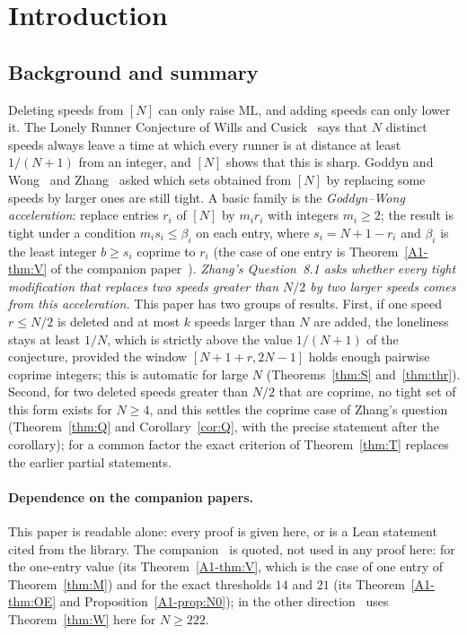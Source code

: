 \documentclass[11pt]{article}
\theoremstyle{definition}
\theoremstyle{remark}
\newcommand{\ML}{\mathrm{ML}}
\newcommand{\xA}[1]{\ref{A1-#1}}
\begin{document}
\section{Introduction}\label{sec:intro}

\subsection{Background and summary}
Deleting speeds from $[N]$ can only raise $\ML$, and adding speeds can only lower it. The Lonely Runner Conjecture of Wills and Cusick~\cite{W} says that $N$ distinct speeds always leave a time at which every runner is at distance at least $1/(N+1)$ from an integer, and $[N]$ shows that this is sharp. Goddyn and Wong~\cite{GW} and Zhang~\cite{Z} asked which sets obtained from $[N]$ by replacing some speeds by larger ones are still tight. A basic family is the \emph{Goddyn--Wong acceleration}: replace entries $r_i$ of $[N]$ by $m_ir_i$ with integers $m_i\ge2$; the result is tight under a condition $m_is_i\le\beta_i$ on each entry, where $s_i=N+1-r_i$ and $\beta_i$ is the least integer $b\ge s_i$ coprime to $r_i$ (the case of one entry is Theorem~\xA{thm:V} of the companion paper~\cite{A1}). \emph{Zhang's Question~8.1 asks whether every tight modification that replaces two speeds greater than $N/2$ by two larger speeds comes from this acceleration.} This paper has two groups of results. First, if one speed $r\le N/2$ is deleted and at most $k$ speeds larger than $N$ are added, the loneliness stays at least $1/N$, which is strictly above the value $1/(N+1)$ of the conjecture, provided the window $[N+1+r,2N-1]$ holds enough pairwise coprime integers; this is automatic for large $N$ (Theorems~\ref{thm:S} and~\ref{thm:thr}). Second, for two deleted speeds greater than $N/2$ that are coprime, no tight set of this form exists for $N\ge4$, and this settles the coprime case of Zhang's question (Theorem~\ref{thm:Q} and Corollary~\ref{cor:Q}, with the precise statement after the corollary); for a common factor the exact criterion of Theorem~\ref{thm:T} replaces the earlier partial statements.

\paragraph{Dependence on the companion papers.}
This paper is readable alone: every proof is given here, or is a Lean statement cited from the library. The companion~\cite{A1} is quoted, not used in any proof here: for the one-entry value (its Theorem~\xA{thm:V}, which is the case of one entry of Theorem~\ref{thm:M}) and for the exact thresholds $14$ and $21$ (its Theorem~\xA{thm:OE} and Proposition~\xA{prop:N0}); in the other direction~\cite{A1} uses Theorem~\ref{thm:W} here for $N\ge222$.
\end{document}
